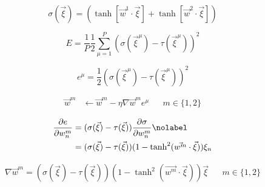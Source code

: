 
\begin{equation}\label{eq:1:sigma}
	\sigma(\vec{\xi}) = (\tanh[\vec{w}^1 \cdot \vec{\xi}] + \tanh[\vec{w}^2 \cdot \vec{\xi}])
\end{equation}

\begin{equation}\label{eq:1:cost}
	E = \frac{1}{P} \frac{1}{2} \sum_{\mu = 1}^P (\sigma(\vec{\xi}^\mu) - \tau(\vec{\xi}^\mu))^2
\end{equation}

\begin{equation}\label{eq:1:contribution}
	e^\mu = \frac{1}{2}(\sigma(\vec{\xi}^\mu) - \tau(\vec{\xi}^\mu))^2
\end{equation}

\begin{align}\label{eq:1:update}
	\vec{w}^m & \leftarrow \vec{w}^m - \eta \nabla \vec{w}^m e^\mu && m \in \{1, 2\}
\end{align}

\begin{align}\label{eq:1:gradient}
	\frac{\partial e}{\partial w_n^m} & = (\sigma(\vec{\xi}) - \tau(\vec{\xi})) \frac{\partial \sigma}{\partial w_n^m} \nolabel \\
	~& = (\sigma(\vec{\xi}) - \tau(\vec{\xi})) (1 - \tanh^2(\vec{w^m} \cdot \vec{\xi})) \xi_n 
\end{align}

\begin{align}\label{eq:1:gradient_vector}
	\nabla \vec{w}^m = (\sigma(\vec{\xi}) - \tau(\vec{\xi})) (1 - \tanh^2(\vec{w^m} \cdot \vec{\xi})) \vec{\xi} && m \in \{1, 2\}
\end{align}

